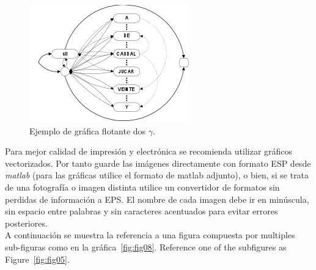 \documentclass[
10pt,			%
letterpaper,	%
oneside,		%
headinclude, footinclude, %
BCOR5mm, 		%
]{scrartcl}
\begin{document}
\begin{figure}[tbhp]
	\centerline{\includegraphics[scale=0.75]{fig03}}
	\caption[Ejemplo de gráfica flotante $\gamma$]{Ejemplo de gráfica flotante dos $\gamma$.} %
	\label{fig:fig03}
\end{figure}

Para mejor calidad de impresión y electrónica se recomienda utilizar gráficos vectorizados. Por tanto guarde las imágenes directamente con formato ESP desde \emph{matlab} (para las gráficas utilice el formato de matlab adjunto), o bien, si se trata de una fotografía o imagen distinta utilice un convertidor de formatos sin perdidas de información a EPS. El nombre de cada imagen debe ir en minúscula, sin espacio entre palabras y sin caracteres acentuados para evitar errores posteriores.\\
A continuación se muestra la referencia a una figura compuesta por multiples sub-figuras como en la gráfica~\vref{fig:fig08}. Reference one of the subfigures as Figure~\vref{fig:fig05}.
\end{document}
